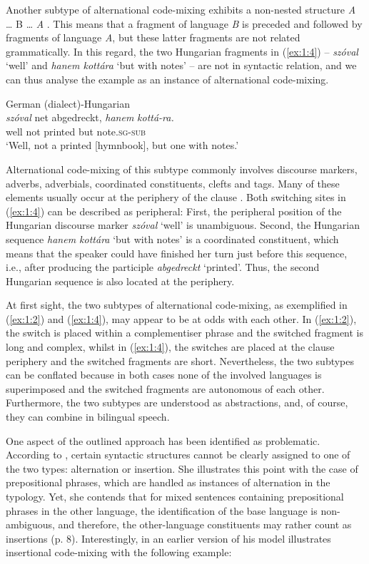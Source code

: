 Another subtype of alternational code-mixing exhibits a non-nested structure \textit{A} {\dots} B {\dots} \textit{A} \citep[cf.][97--103]{muysken-bilingual-2000}. This means that a fragment of language \textit{B} is preceded and followed by fragments of language \textit{A}, but these latter fragments are not related grammatically. In this regard, the two Hungarian fragments in (\ref{ex:1:4}) -- \textit{szóval} `well' and \textit{hanem kottára} `but with notes' -- are not in syntactic relation, and we can thus analyse the example as an instance of alternational code-mixing.

\ea{\label{ex:1:4}}
German (dialect)-Hungarian \citep[260]{szabo-language-2010}\\
\gll \textit{szóval} net abgedreckt, \textit{hanem} \textit{kottá-ra.}\\
	well not printed but note.\textsc{sg-sub}\\
\glt `Well, not a printed [hymnbook], but one with notes.' 
\z 

\noindent Alternational code-mixing of this subtype commonly involves discourse markers, adverbs, adverbials, coordinated constituents, clefts and tags. Many of these elements usually occur at the periphery of the clause \citep[97--99]{muysken-bilingual-2000}. Both switching sites in (\ref{ex:1:4}) can be described as peripheral: First, the peripheral position of the Hungarian discourse marker \textit{szóval} `well' is unambiguous. Second, the Hungarian sequence \textit{hanem kottára} `but with notes' is a coordinated constituent, which means that the speaker could have finished her turn just before this sequence, i.e., after producing the participle \textit{abgedreckt} `printed'. Thus, the second Hungarian sequence is also located at the periphery.

At first sight, the two subtypes of alternational code-mixing, as exemplified in (\ref{ex:1:2}) and (\ref{ex:1:4}), may appear to be at odds with each other. In (\ref{ex:1:2}), the switch is placed within a complementiser phrase and the switched fragment is long and complex, whilst in (\ref{ex:1:4}), the switches are placed at the clause periphery and the switched fragments are short. Nevertheless, the two subtypes can be conflated because in both cases none of the involved languages is superimposed and the switched fragments are autonomous of each other. Furthermore, the two subtypes are understood as abstractions, and, of course, they can combine in bilingual speech.

One aspect of the outlined approach has been identified as problematic. According to \citet[][7]{muhamedowa-untersuchung-2006}, certain syntactic structures cannot be clearly assigned to one of the two types: alternation or insertion. She illustrates this point with the case of prepositional phrases, which are handled as instances of alternation in the typology. Yet, she contends that for mixed sentences containing prepositional phrases in the other language, the identification of the base language is non-ambiguous, and therefore, the other-language constituents may rather count as insertions (p. 8). Interestingly, in an earlier version of his model \citet{muysken-code-switching-1997} illustrates insertional code-mixing with the following example:

